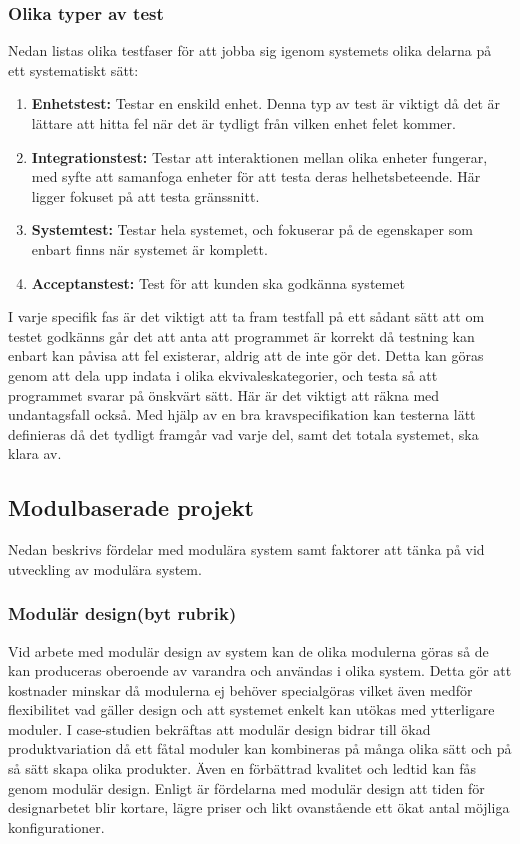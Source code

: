 \documentclass[11pt]{article}
\begin{document}
\begin{flushleft}
\subsubsection{Olika typer av test}
Nedan listas olika testfaser för att jobba sig igenom systemets olika delarna på ett systematiskt sätt:
\begin{enumerate}
	\item \textbf{Enhetstest:} Testar en enskild enhet. Denna typ av test är viktigt då det är lättare att hitta fel när det är tydligt från vilken enhet felet kommer.
	\item \textbf{Integrationstest:} Testar att interaktionen mellan olika enheter fungerar, med syfte att samanfoga enheter för att testa deras helhetsbeteende. Här ligger fokuset på att testa gränssnitt.
	\item \textbf{Systemtest:} Testar hela systemet, och fokuserar på de egenskaper som enbart finns när systemet är komplett.
	\item \textbf{Acceptanstest:} Test för att kunden ska godkänna systemet  
\end{enumerate}

I varje specifik fas är det viktigt att ta fram testfall på ett sådant sätt att om testet godkänns går det att anta att programmet är korrekt då testning kan enbart kan påvisa att fel existerar, aldrig att de inte gör det. Detta kan göras genom att dela upp indata i olika ekvivaleskategorier, och testa så att programmet svarar på önskvärt sätt. Här är det viktigt att räkna med undantagsfall också.\cite{tester} Med hjälp av en bra kravspecifikation kan testerna lätt definieras då det tydligt framgår vad varje del, samt det totala systemet, ska klara av. 

\subsection{Modulbaserade projekt}

Nedan beskrivs fördelar med modulära system samt faktorer att tänka på vid utveckling av modulära system.

\subsubsection{Modulär design(byt rubrik)}

Vid arbete med modulär design av system kan de olika modulerna göras så de kan produceras oberoende av varandra och användas i olika system. Detta gör att kostnader minskar då modulerna ej behöver specialgöras vilket även medför flexibilitet vad gäller design och att systemet enkelt kan utökas med ytterligare moduler.\cite{ReMoRo} I case-studien \cite{MMPD} bekräftas att modulär design bidrar till ökad produktvariation då ett fåtal moduler kan kombineras på många olika sätt och på så sätt skapa olika produkter. Även en förbättrad kvalitet och ledtid kan fås genom modulär design. Enligt \cite{MRDCRD} är fördelarna med modulär design att tiden för designarbetet blir kortare, lägre priser och likt ovanstående ett ökat antal möjliga konfigurationer. 



\end{flushleft}
\end{document}
